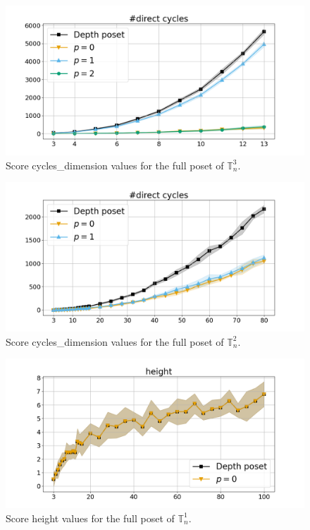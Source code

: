 \documentclass{article}
\begin{document}
    \begin{figure}[h!]
        \centering
        \hspace*{-0.24\textwidth}
        \includegraphics[width=1.4\textwidth]{pics/extended torus scores/score=cycles-dimension, dim=3, object=full.png}
        \caption{Score cycles\_dimension values for the full poset of $\mathbb{T}_n^{3}$.}
        \label{fig:cyclesdimension-full3}
    \end{figure}
    \begin{figure}[h!]
        \centering
        \hspace*{-0.24\textwidth}
        \includegraphics[width=1.4\textwidth]{pics/extended torus scores/score=cycles-dimension, dim=2, object=full.png}
        \caption{Score cycles\_dimension values for the full poset of $\mathbb{T}_n^{2}$.}
        \label{fig:cyclesdimension-full2}
    \end{figure}
    \begin{figure}[h!]
        \centering
        \hspace*{-0.24\textwidth}
        \includegraphics[width=1.4\textwidth]{pics/extended torus scores/score=height, dim=1, object=full.png}
        \caption{Score height values for the full poset of $\mathbb{T}_n^{1}$.}
        \label{fig:height-full1}
    \end{figure}
\end{document}
